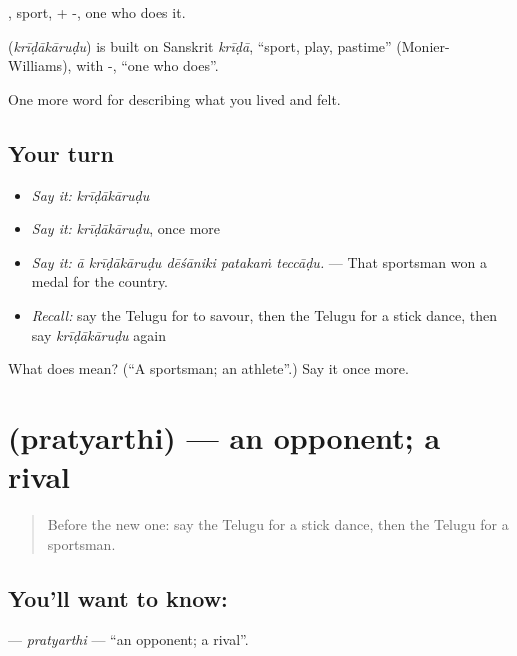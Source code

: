 , sport, + -, one who does it.

\begin{cousinweb}
\textbf{} (\emph{krīḍākāruḍu}) is built on Sanskrit \emph{krīḍā}, \textquotedblleft{}sport, play, pastime\textquotedblright{} (Monier-Williams), with -, \textquotedblleft{}one who does\textquotedblright{}.
\end{cousinweb}

\begin{grammarlens}[title={What you've built}]
One more word for describing what you lived and felt.
\end{grammarlens}

\subsection*{Your turn}
\begin{itemize}
\raggedright
  \item \emph{Say it:} \emph{krīḍākāruḍu}
  \item \emph{Say it:} \emph{krīḍākāruḍu}, once more
  \item \emph{Say it:} \emph{ā krīḍākāruḍu dēśāniki patakaṁ teccāḍu.} — That sportsman won a medal for the country.
  \item \emph{Recall:} say the Telugu for to savour, then the Telugu for a stick dance, then say \emph{krīḍākāruḍu} again
\end{itemize}

\begin{tcolorbox}[breakable,colback=teal!4,colframe=teal!35!black,title={Before you move on}]
What does  mean? (\textquotedblleft{}A sportsman; an athlete\textquotedblright{}.) Say it once more.
\end{tcolorbox}
\section[\texorpdfstring{\te{ప్రత్యర్థి} (pratyarthi)}{ప్రత్యర్థి (pratyarthi)}]{ (pratyarthi) — an opponent; a rival}

\label{lesson:TE-C544-pratyarthi}



\begin{quote}
Before the new one: say the Telugu for a stick dance, then the Telugu for a sportsman.
\end{quote}

\subsection*{You'll want to know: }
\textbf{} — \emph{pratyarthi} — \textquotedblleft{}an opponent; a rival\textquotedblright{}.

